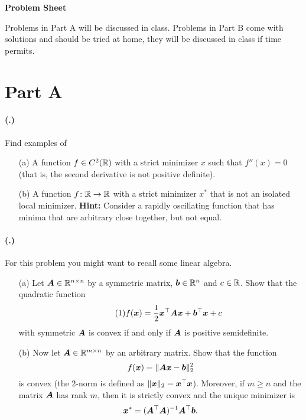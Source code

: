 \documentclass{article}
\newcounter{problemSheetNumber}
\newcounter{problems}
\renewcommand{\problem}{\paragraph{(\theproblemSheetNumber.\theproblems)}\addtocounter{problems}{1}}
\begin{document}
 
\begin{center}
{\Large {\bf Problem Sheet \theproblemSheetNumber}}
\end{center}

Problems in Part A will be discussed in class. Problems in Part B come with solutions and should be tried at home, they will be discussed in class if time permits. 

\section*{Part A}

 \problem Find examples of
\begin{itemize}
 \item[(a)] A function $f\in C^2(\mathbb{R})$ with a strict minimizer $x$ such that $f''(x)=0$ (that is, the second derivative is not positive definite).
 \item[(b)] A function $f\colon \mathbb{R}\to \mathbb{R}$ with a strict minimizer $x^*$ that is not an isolated local minimizer. \textbf{Hint: } Consider a rapidly oscillating function that has minima that are arbitrary close together, but not equal.
\end{itemize}

\problem For this problem you might want to recall some linear algebra.
\begin{itemize} 
 \item[(a)] Let $\bm{A}\in \mathbb{R}^{n\times n}$ by a symmetric matrix, $\bm{b}\in \mathbb{R}^n$ and $c\in \mathbb{R}$. Show that the quadratic function
 \begin{equation}\label{eq:quad}\tag{1}
f(\bm{x}) = \frac{1}{2}\bm{x}^{\top}\bm{A}\bm{x}+\bm{b}^{\top}\bm{x}+c  
 \end{equation}
 with symmetric $\bm{A}$
is convex if and only if $\bm{A}$ is positive semidefinite.
\item[(b)] Now let $\bm{A}\in \mathbb{R}^{m\times n}$ by an arbitrary matrix. Show that the function
\begin{equation*}
 f(\bm{x}) = \Vert {\bm{A}\bm{x}-\bm{b}}\Vert_2^2
\end{equation*}
is convex (the $2$-norm is defined as $\Vert {\bm{x}}\Vert_2=\bm{x}^{\top}\bm{x}$). Moreover, if $m\geq n$ and the matrix $\bm{A}$ has rank $m$, then it is strictly convex and the unique minimizer is
\begin{equation*}
 \bm{x}^* = (\bm{A}^{\top}\bm{A})^{-1}\bm{A}^{\top}\bm{b}.
\end{equation*}
\end{itemize}
\end{document}
